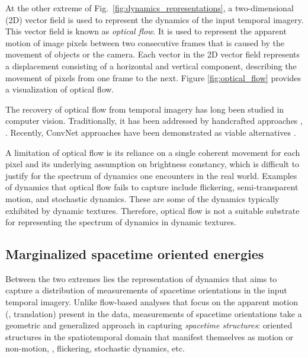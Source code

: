 At the other extreme of Fig.\ \ref{fig:dynamics_representations}, a two-dimensional (2D) vector field is used to represent the dynamics of the input temporal imagery. This vector field is known as \emph{optical flow}. It is used to represent the apparent motion of image pixels between two consecutive frames that is caused by the movement of objects or the camera. Each vector in the 2D vector field represents a displacement consisting of a horizontal and vertical component, describing the movement of pixels from one frame to the next. Figure \ref{fig:optical_flow} provides a visualization of optical flow.

The recovery of optical flow from temporal imagery has long been studied in computer vision. Traditionally, it has been addressed by handcrafted approaches \eg, \cite{horn1981,lucas1981,revaud2015epicflow}. Recently, ConvNet approaches have been demonstrated as viable alternatives \cite{dosovitskiy2015,ilg2017,ranjan2017,yu2016}.

A limitation of optical flow is its reliance on a single coherent movement for each pixel and its underlying assumption on brightness constancy, which is difficult to justify for the spectrum of dynamics one encounters in the real world. Examples of dynamics that optical flow fails to capture include flickering, semi-transparent motion, and stochastic dynamics. These are some of the dynamics typically exhibited by dynamic textures. Therefore, optical flow is not a suitable substrate for representing the spectrum of dynamics in dynamic textures.

\subsection{Marginalized spacetime oriented energies}
\label{sec:msoe}

Between the two extremes lies the representation of dynamics that aims to capture a distribution of measurements of spacetime orientations in the input temporal imagery.
Unlike flow-based analyses that focus on the apparent motion (\ie, translation) present in the data, measurements of spacetime orientations take a geometric and generalized approach in capturing \emph{spacetime structures}: oriented structures in the spatiotemporal domain that manifest themselves as motion or non-motion, \eg, flickering, stochastic dynamics, etc.

